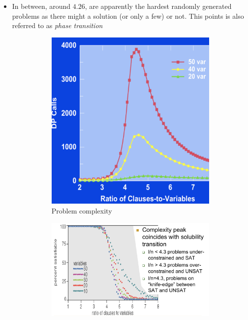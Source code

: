 \begin{itemize}
	\item In between, around $4.26$, are apparently the hardest randomly generated problems as there might a solution (or only a few) or not. This points is also referred to as \textit{phase transition}
	\begin{figure}[ht!]
		\centering
		\begin{subfigure}[b]{0.23\textwidth}
			\centering
			\includegraphics[width=\textwidth]{figures/kr_sat_prob_hardness.png}
			\caption{Problem complexity}
		\end{subfigure}
		\hspace{10mm}
		\begin{subfigure}[b]{0.4\textwidth}
			\centering
			\includegraphics[width=\textwidth]{figures/kr_sat_prob_hardness_2.png}

\end{subfigure}
\end{figure}
\end{itemize}
